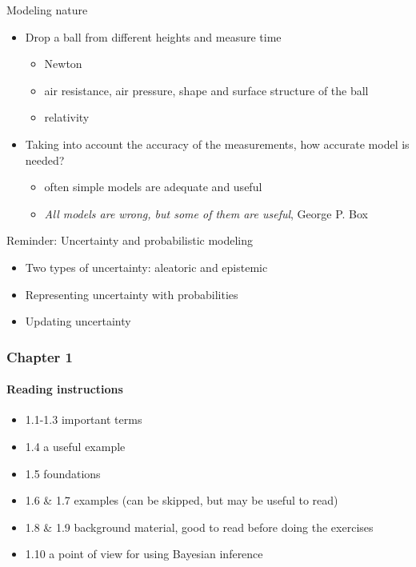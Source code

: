 \documentclass[english,t]{beamer}
\begin{document}
\begin{frame}{Modeling nature}

  \begin{itemize}
  \item Drop a ball from different heights and measure time
    \pause
    \begin{itemize}
    \item Newton
    \item air resistance, air pressure, shape and surface structure of the ball
    \item relativity
    \end{itemize}
    \pause
  \item Taking into account the accuracy of the measurements, how
    accurate model is needed?
    \pause
    \begin{itemize}
    \item often simple models are adequate and useful
    \item \emph{All models are wrong, but some of them are useful},
      George P. Box
    \end{itemize}
  \end{itemize}

\end{frame}

\begin{frame}{Reminder: Uncertainty and probabilistic modeling}

  \begin{itemize}
  \item Two types of uncertainty: aleatoric and epistemic
    \vspace{\baselineskip}
  \item Representing uncertainty with probabilities
    \vspace{\baselineskip}
  \item Updating uncertainty
    \vspace{\baselineskip}
   \end{itemize}
\end{frame}

\begin{frame}
  \frametitle{Chapter 1}  %
  \framesubtitle{Reading instructions}
  \begin{itemize}
\item 1.1-1.3 important terms
\item 1.4 a useful example
\item 1.5 foundations
\item 1.6 \& 1.7 examples (can be skipped, but may be useful to read)
\item 1.8 \& 1.9 background material, good to read before doing the exercises
\item 1.10 a point of view for using Bayesian inference
  \end{itemize}

\end{frame}
\end{document}
